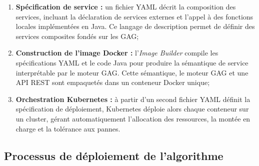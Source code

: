 \begin{enumerate}
\item \textbf{Spécification de service :} un fichier YAML décrit la composition des services, incluant la déclaration de services externes et l’appel à des fonctions locales implémentées en Java. Ce langage de description permet de définir des services composites fondés sur les GAG;
\item \textbf{Construction de l'image Docker :} l’\emph{Image Builder} compile les spécifications YAML et le code Java pour produire la sémantique de service interprétable par le moteur GAG. Cette sémantique, le moteur GAG et une API REST sont empaquetés dans un conteneur Docker unique;
\item \textbf{Orchestration Kubernetes :} à partir d'un second fichier YAML définit la spécification de déploiement, Kubernetes déploie alors chaque conteneur sur un cluster, gérant automatiquement l’allocation des ressources, la montée en charge et la tolérance aux pannes.
\end{enumerate}


\subsection{Processus de déploiement de l'algorithme}{}

